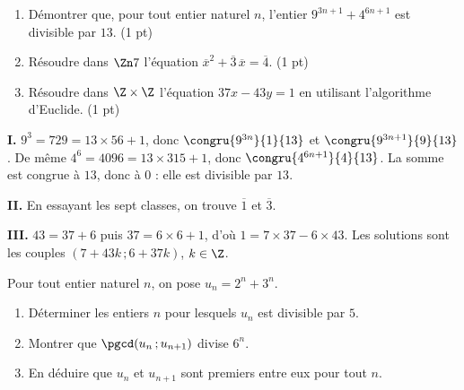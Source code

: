 \begin{commeaubac}
\begin{enumerate}[label=\textbf{\Roman*.}, leftmargin=*, itemsep=0.3em]
  \item Démontrer que, pour tout entier naturel $n$, l'entier
        $9^{3n+1}+4^{6n+1}$ est divisible par $13$. \hfill\textup{(1 pt)}
  \item Résoudre dans $\Zn 7$ l'équation
        $\overline x^{2}+\overline3\,\overline x = \overline4$.
        \hfill\textup{(1 pt)}
  \item Résoudre dans $\Z\times\Z$ l'équation $37x-43y = 1$ en utilisant
        l'algorithme d'Euclide. \hfill\textup{(1 pt)}
\end{enumerate}
\end{commeaubac}

\begin{corrige}
\textbf{I.} $9^{3} = 729 = 13\times56+1$, donc $\congru{9^{3n}}{1}{13}$ et
$\congru{9^{3n+1}}{9}{13}$. De même $4^{6} = 4096 = 13\times315+1$, donc
$\congru{4^{6n+1}}{4}{13}$. La somme est congrue à $13$, donc à $0$ : elle est
divisible par $13$.

\textbf{II.} En essayant les sept classes, on trouve $\overline1$ et
$\overline3$.

\textbf{III.} $43 = 37+6$ puis $37 = 6\times6+1$, d'où
$1 = 7\times37-6\times43$. Les solutions sont les couples
$(7+43k\,;6+37k)$, $k \in \Z$.
\end{corrige}

\begin{concours}
Pour tout entier naturel $n$, on pose $u_{n} = 2^{n}+3^{n}$.

\begin{enumerate}[label=\textbf{\arabic*.}, leftmargin=*, itemsep=0.25em]
  \item Déterminer les entiers $n$ pour lesquels $u_{n}$ est divisible par
        $5$.
  \item Montrer que $\pgcd(u_{n}\,;u_{n+1})$ divise $6^{n}$.
  \item En déduire que $u_{n}$ et $u_{n+1}$ sont premiers entre eux pour tout
        $n$.
\end{enumerate}
\end{concours}

